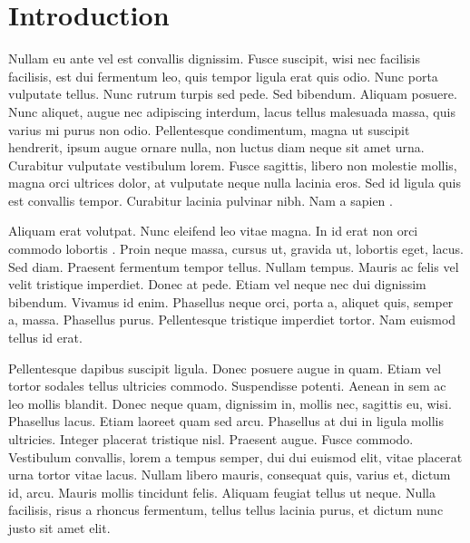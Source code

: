 \section*{Introduction}
Nullam eu ante vel est convallis dignissim.  Fusce suscipit, wisi nec facilisis facilisis, est dui fermentum leo, quis tempor ligula erat quis odio.  Nunc porta vulputate tellus.  Nunc rutrum turpis sed pede.  Sed bibendum.  Aliquam posuere.  Nunc aliquet, augue nec adipiscing interdum, lacus tellus malesuada massa, quis varius mi purus non odio.  Pellentesque condimentum, magna ut suscipit hendrerit, ipsum augue ornare nulla, non luctus diam neque sit amet urna.  Curabitur vulputate vestibulum lorem.  Fusce sagittis, libero non molestie mollis, magna orci ultrices dolor, at vulputate neque nulla lacinia eros.  Sed id ligula quis est convallis tempor.  Curabitur lacinia pulvinar nibh.  Nam a sapien \cite{lee_2022_creating}.

Aliquam erat volutpat.  Nunc eleifend leo vitae magna.  In id erat non orci commodo lobortis \cite{lee_2022_creating,dyda_2015_mechanism}.  Proin neque massa, cursus ut, gravida ut, lobortis eget, lacus.  Sed diam.  Praesent fermentum tempor tellus.  Nullam tempus.  Mauris ac felis vel velit tristique imperdiet.  Donec at pede.  Etiam vel neque nec dui dignissim bibendum.  Vivamus id enim.  Phasellus neque orci, porta a, aliquet quis, semper a, massa.  Phasellus purus.  Pellentesque tristique imperdiet tortor.  Nam euismod tellus id erat.

Pellentesque dapibus suscipit ligula.  Donec posuere augue in quam.  Etiam vel tortor sodales tellus ultricies commodo.  Suspendisse potenti.  Aenean in sem ac leo mollis blandit.  Donec neque quam, dignissim in, mollis nec, sagittis eu, wisi.  Phasellus lacus.  Etiam laoreet quam sed arcu.  Phasellus at dui in ligula mollis ultricies.  Integer placerat tristique nisl.  Praesent augue.  Fusce commodo.  Vestibulum convallis, lorem a tempus semper, dui dui euismod elit, vitae placerat urna tortor vitae lacus.  Nullam libero mauris, consequat quis, varius et, dictum id, arcu.  Mauris mollis tincidunt felis.  Aliquam feugiat tellus ut neque.  Nulla facilisis, risus a rhoncus fermentum, tellus tellus lacinia purus, et dictum nunc justo sit amet elit.


